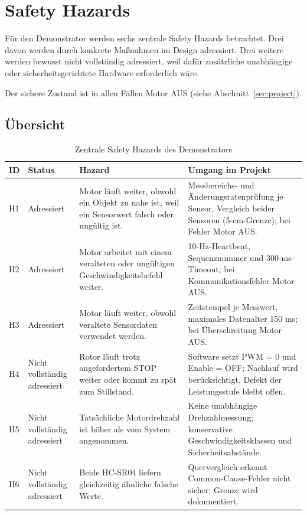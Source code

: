 \clearpage
\section{Safety Hazards}
\label{sec:hazards}

Für den Demonstrator werden sechs zentrale Safety Hazards betrachtet. Drei davon
werden durch konkrete Maßnahmen im Design adressiert. Drei weitere werden bewusst
nicht vollständig adressiert, weil dafür zusätzliche unabhängige oder
sicherheitsgerichtete Hardware erforderlich wäre.

Der sichere Zustand ist in allen Fällen Motor AUS (siehe Abschnitt~\ref{sec:project}).

\subsection{Übersicht}

\begin{table}[H]
    \centering
    \small
    \begin{tabularx}{\textwidth}{@{}p{0.7cm}p{2.6cm}YY@{}}
        \toprule
        \textbf{ID} & \textbf{Status} & \textbf{Hazard} & \textbf{Umgang im Projekt} \\
        \midrule
        H1 & Adressiert & Motor läuft weiter, obwohl ein Objekt zu nahe ist, weil ein Sensorwert falsch oder ungültig ist. & Messbereichs- und Änderungsratenprüfung je Sensor, Vergleich beider Sensoren (5-cm-Grenze); bei Fehler Motor AUS. \\
        H2 & Adressiert & Motor arbeitet mit einem veralteten oder ungültigen Geschwindigkeitsbefehl weiter. & 10-Hz-Heartbeat, Sequenznummer und 300-ms-Timeout; bei Kommunikationsfehler Motor AUS. \\
        H3 & Adressiert & Motor läuft weiter, obwohl veraltete Sensordaten verwendet werden. & Zeitstempel je Messwert, maximales Datenalter 150 ms; bei Überschreitung Motor AUS. \\
        H4 & Nicht vollständig adressiert & Rotor läuft trotz angefordertem STOP weiter oder kommt zu spät zum Stillstand. & Software setzt PWM = 0 und Enable = OFF; Nachlauf wird berücksichtigt, Defekt der Leistungsstufe bleibt offen. \\
        H5 & Nicht vollständig adressiert & Tatsächliche Motordrehzahl ist höher als vom System angenommen. & Keine unabhängige Drehzahlmessung; konservative Geschwindigkeitsklassen und Sicherheitsabstände. \\
        H6 & Nicht vollständig adressiert & Beide HC-SR04 liefern gleichzeitig ähnliche falsche Werte. & Quervergleich erkennt Common-Cause-Fehler nicht sicher; Grenze wird dokumentiert. \\
        \bottomrule
    \end{tabularx}
    \caption{Zentrale Safety Hazards des Demonstrators}
\end{table}

